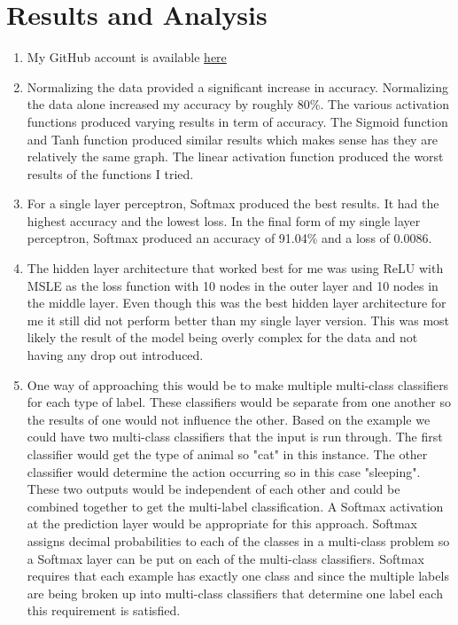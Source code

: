 \documentclass{article}
\begin{document}
\section{Results and Analysis}
\begin{enumerate}
  \item My GitHub account is available
\href{https://github.com/Dalton098}{here}
  \item Normalizing the data provided a significant increase in accuracy. Normalizing the data alone increased my accuracy by roughly 80\%. The various activation functions produced varying results in term of accuracy. The Sigmoid function and Tanh function produced similar results which makes sense has they are relatively the same graph. The linear activation function produced the worst results of the functions I tried.
  \item For a single layer perceptron, Softmax produced the best results. It had the highest accuracy and the lowest loss. In the final form of my single layer perceptron, Softmax produced an accuracy of 91.04\% and a loss of 0.0086.
  \item The hidden layer architecture that worked best for me was using ReLU with MSLE as the loss function with 10 nodes in the outer layer and 10 nodes in the middle layer. Even though this was the best hidden layer architecture for me it still did not perform better than my single layer version. This was most likely the result of the model being overly complex for the data and not having any drop out introduced.
  \item One way of approaching this would be to make multiple multi-class classifiers for each type of label. These classifiers would be separate from one another so the results of one would not influence the other. Based on the example we could have two multi-class classifiers that the input is run through. The first classifier would get the type of animal so "cat" in this instance. The other classifier would determine the action occurring so in this case "sleeping". These two outputs would be independent of each other and could be combined together to get the multi-label classification. A Softmax activation at the prediction layer would be appropriate for this approach. Softmax assigns decimal probabilities to each of the classes in a multi-class problem so a Softmax layer can be put on each of the multi-class classifiers. Softmax requires that each example has exactly one class and since the multiple labels are being broken up into multi-class classifiers that determine one label each this requirement is satisfied.
\end{enumerate}
\end{document}
